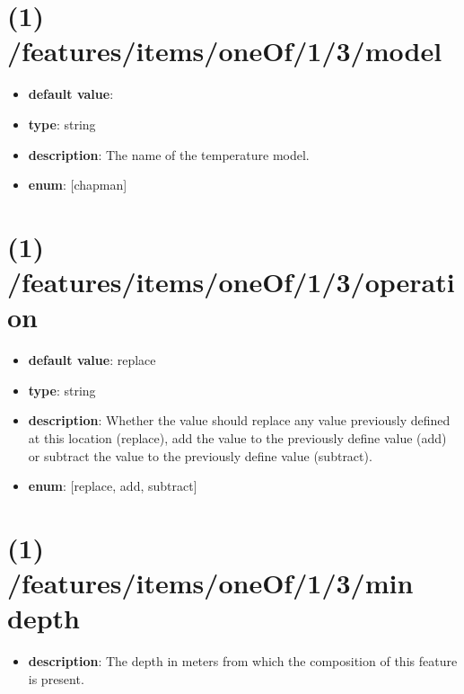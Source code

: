 \section{(1) /features/items/oneOf/1/3/model}
\begin{itemize}[leftmargin=1em]\item {\bf default value}: 
\item {\bf type}: string
\item {\bf description}: The name of the temperature model.
\item {\bf enum}: [chapman]\end{itemize}\section{(1) /features/items/oneOf/1/3/operation}
\begin{itemize}[leftmargin=1em]\item {\bf default value}: replace
\item {\bf type}: string
\item {\bf description}: Whether the value should replace any value previously defined at this location (replace), add the value to the previously define value (add) or subtract the value to the previously define value (subtract).
\item {\bf enum}: [replace, add, subtract]\end{itemize}\section{(1) /features/items/oneOf/1/3/min depth}
\begin{itemize}[leftmargin=1em]\item {\bf description}: The depth in meters from which the composition of this feature is present.
\end{itemize}
